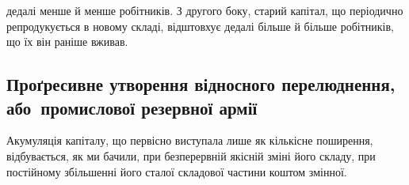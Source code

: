 \parcont{}  %
дедалі менше й менше робітників. З другого боку, старий капітал,
що періодично репродукується в новому складі, відштовхує
дедалі більше й більше робітників, що їх він раніше вживав.\label{original-540}

\subsection{Проґресивне утворення відносного перелюднення,
або~промислової резервної армії}


Акумуляція капіталу, що первісно виступала лише як кількісне
поширення, відбувається, як ми бачили, при безперервній
якісній зміні його складу, при постійному збільшенні його сталої
складової частини коштом змінної.

